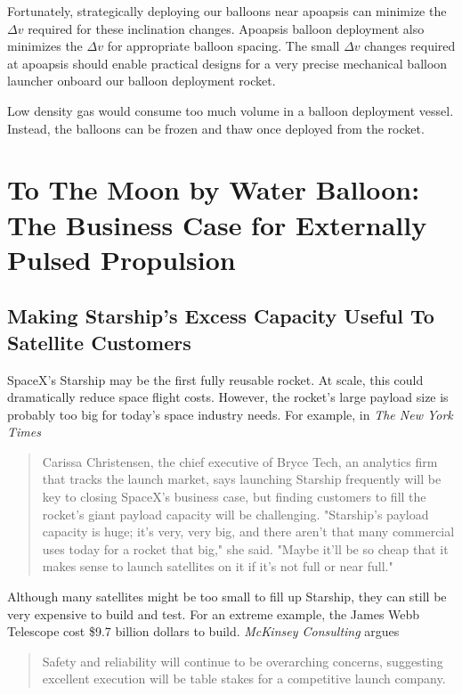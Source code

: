 \documentclass{article}
\begin{document}
{Fortunately, strategically deploying our balloons near apoapsis can minimize the $\Delta v$ required for these inclination changes. Apoapsis balloon deployment also minimizes the $\Delta v$ for appropriate balloon spacing. The small $\Delta v$ changes required at apoapsis should enable practical designs for a very precise mechanical balloon launcher onboard our balloon deployment rocket.

Low density gas would consume too much volume in a balloon deployment vessel.   Instead, the balloons can be frozen and thaw once deployed from the rocket. 

\section{To The Moon by Water Balloon:  The Business Case for Externally Pulsed Propulsion}   

\subsection{Making Starship's Excess Capacity Useful To Satellite Customers} \label{sec:starship_safelaunch}

SpaceX's Starship may be the first fully reusable rocket. At scale, this could dramatically reduce space flight costs.   However, the rocket's large payload size is probably too big for today's space industry needs. For example, in \textit{The New York Times}

\begin{quote}
Carissa Christensen, the chief executive of Bryce Tech, an analytics firm that tracks the launch market, says launching Starship frequently will be key to closing SpaceX’s business case, but finding customers to fill the rocket’s giant payload capacity will be challenging. 
"Starship's payload capacity is huge; it's very, very big, and there aren't that many commercial uses today for a rocket that big," she said.  "Maybe it'll be so cheap that it makes sense to launch satellites on it if it's not full or near full."  \cite{nyt_starship_size}
\end{quote}

Although many satellites might be too small to fill up Starship, they can still be very expensive to build and test. For an extreme example, the James Webb Telescope \cite{james_webb_space_telescope} cost \$9.7 billion dollars \cite{jwst_cost} to build. \textit{McKinsey Consulting} argues 

\begin{quote}
Safety and reliability will continue to be overarching concerns, suggesting excellent execution will be table stakes for a competitive launch company. \cite{mckinsey_reliability}
\end{quote}

}
\end{document}
